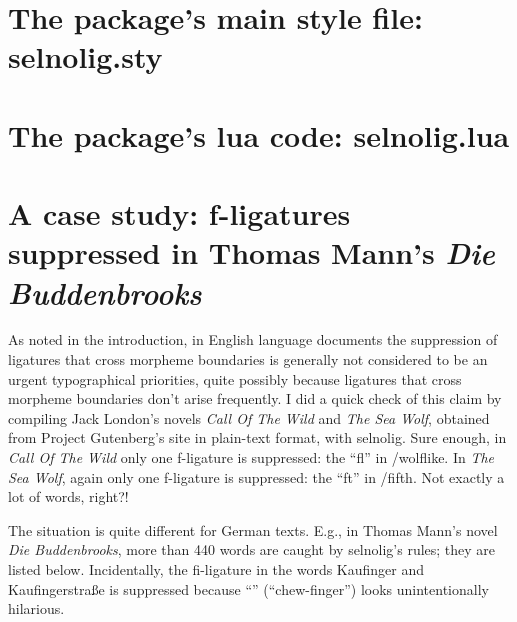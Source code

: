 \documentclass[11pt]{article}
\newcommand{\pkg}[1]{\textsf{#1}}
\begin{document}
\bigskip

\begin{multicols}{2}
\end{multicols}

\clearpage
\section[The package's main style file: selnolig.sty]
{The package's main style file: \pkg{selnolig.sty}}
\label{sec:sty}


\clearpage
\section[The package's lua code: selnolig.lua]{The package's lua code: \pkg{selnolig.lua}}
\label{sec:luacode}


\clearpage
\selnoligon
\section{A case study: f-ligatures suppressed in Thomas Mann's \emph{Die Buddenbrooks}} \label{sec:budd}


As noted in the introduction, in English language documents the suppression of ligatures that cross morpheme boundaries is generally not considered to be an  urgent typographical priorities, quite possibly because ligatures that cross morpheme boundaries don't arise frequently. I did a quick check of this claim by compiling Jack London's novels \emph{Call Of The Wild} and \emph{The Sea Wolf}, obtained from Project Gutenberg's site in plain-text format, with \pkg{selnolig}. Sure enough, in \emph{Call Of The Wild} only one f-ligature is suppressed: the \enquote{fl} in \slash wolflike. In \emph{The Sea Wolf}, again only one f-ligature is suppressed: the \enquote{ft} in \slash fifth. Not exactly a lot of words, right?!

The situation is quite different for German texts. E.g., in Thomas Mann's novel \emph{Die Buddenbrooks}, more than 440 words are caught by \pkg{selnolig}'s rules; they are listed below. Incidentally, the fi-ligature in the words Kaufinger and Kaufingerstraße is suppressed because \enquote{} (\enquote{chew-finger}) looks unintentionally hilarious.

\enlargethispage{1\baselineskip}
\end{document}
